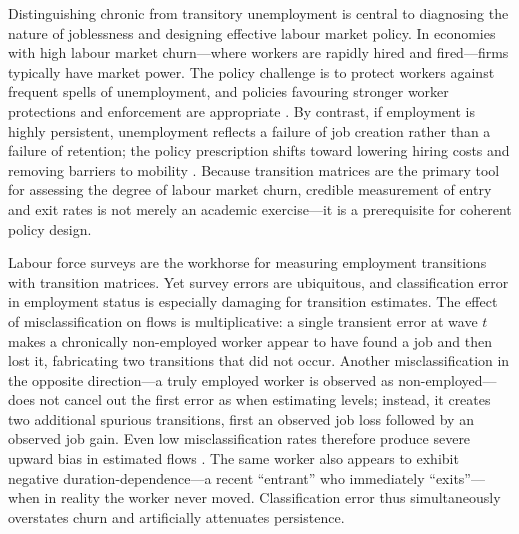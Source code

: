 
Distinguishing chronic from transitory unemployment is central to diagnosing the
nature of joblessness and designing effective labour market policy. In economies with high labour market
churn---where workers are rapidly hired and fired---firms typically have 
market power. The policy challenge is to protect workers against frequent 
spells of unemployment, and
policies favouring stronger worker protections and enforcement are appropriate
\citep{aghion2006}. By contrast, if employment is highly persistent, unemployment
reflects a failure of job creation rather than a failure of retention; the
policy prescription shifts toward lowering hiring costs and removing barriers to
mobility \citep{nattrass2000}. Because transition matrices are the primary tool
for assessing the degree of labour market churn, credible measurement of
entry and exit rates is not merely an academic exercise---it is a prerequisite
for coherent policy design.

Labour force surveys are the workhorse for measuring employment transitions with transition matrices.
Yet survey errors are ubiquitous, and classification error in employment status
is especially damaging for transition estimates. The effect of misclassification
on flows is multiplicative: a single transient error at wave $t$ makes a
chronically non-employed worker appear to have found a job and then lost it,
fabricating two transitions that did not occur. Another misclassification in 
the opposite direction---a truly employed worker is observed as non-employed---does not
cancel out the first error as when estimating levels; instead, it creates two additional
spurious transitions, first an observed job loss followed by an observed job gain. 
Even low misclassification rates
therefore produce severe upward bias in estimated flows
\citep{porteba1986,singh1995,meyer1988}. The same worker also appears to
exhibit negative duration-dependence---a recent ``entrant'' who immediately
``exits''---when in reality the worker never moved. Classification error thus
simultaneously overstates churn and artificially attenuates persistence.

